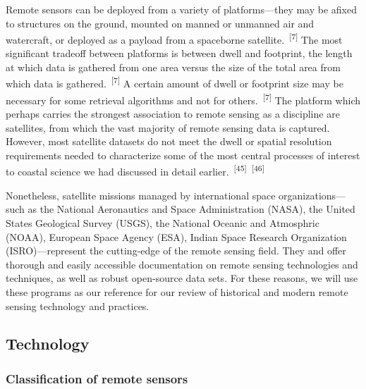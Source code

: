 \documentclass{article}
\begin{document}

\par{Remote sensors can be deployed from a variety of platforms---they may be afixed to structures on the ground, mounted on manned or unmanned air and watercraft, or deployed as a payload from a spaceborne satellite.~\textsuperscript{[7]} The most significant tradeoff between platforms is between dwell and footprint, the length at which data is gathered from one area versus the size of the total area from which data is gathered.~\textsuperscript{[7]} A certain amount of dwell or footprint size may be necessary for some retrieval algorithms and not for others.~\textsuperscript{[7]} The platform which perhaps carries the strongest association to remote sensing as a discipline are satellites, from which the vast majority of remote sensing data is captured. However, most satellite datasets do not meet the dwell or spatial resolution requirements needed to characterize some of the most central processes of interest to coastal science we had discussed in detail earlier.~\textsuperscript{[45]}~\textsuperscript{[46]}}


\par{Nonetheless, satellite missions managed by international space organizations---such as the National Aeronautics and Space Administration (NASA), the United States Geological Survey (USGS), the National Oceanic and Atmosphric (NOAA), European Space Agency (ESA), Indian Space Research Organization (ISRO)---represent the cutting-edge of the remote sensing field. They and offer thorough and easily accessible documentation on remote sensing technologies and techniques, as well as robust open-source data sets. For these reasons, we will use these programs as our reference for our review of historical and modern remote sensing technology and practices.}




\subsection{Technology}

\subsubsection{Classification of remote sensors}
\end{document}
